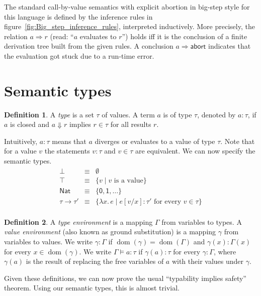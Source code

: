 \documentclass[12pt,a4paper]{article}
\theoremstyle{definition}
\newtheorem{definition}{Definition}
\theoremstyle{plain}
\newcommand{\abort}{\ensuremath{\mathsf{abort}}}
\newcommand{\abstr}[2]{\ensuremath{\lambda{#1}.\,{#2}}}
\newcommand{\Nat}{\ensuremath{\mathsf{Nat}}}
\DeclareMathOperator{\dom}{dom}
\begin{document}
The standard call-by-value semantics with explicit abortion in big-step style for this language
is defined by the inference rules in figure~\ref{fig:Big_step_inference_rules}, interpreted inductively.
More precisely, the relation $a \Rightarrow r$ (read: ``$a$ evaluates to $r$'') holds iff
it is the conclusion of a finite derivation tree built from the given rules. A conclusion
$a \Rightarrow \abort$ indicates that the evaluation got stuck due to a run-time error.


\section{Semantic types}
\label{sec:Semantic_types}

\begin{definition} \label{def:Types}
  A \emph{type} is a set $\tau$ of values. A term $a$ is of type $\tau$, denoted by $a : \tau$,
  if $a$ is closed and $a \Downarrow r$ implies $r \in \tau$ for all results $r$.
\end{definition}

Intuitively, $a : \tau$ means that $a$ diverges or evaluates to a value of type $\tau$. Note that
for a value $v$ the statements $v : \tau$ and $v \in \tau$ are equivalent.
We can now specify the semantic types.
\[\begin{array}{rcl}
  \bot &\equiv& \emptyset \\
  \top &\equiv& \{ v \mid \text{$v$ is a value} \} \\
  \Nat &\equiv& \{ \mathsf{0},\mathsf{1},\ldots \} \\
  \tau \to \tau' &\equiv& \{ \abstr{x}{e} \mid \text{$e[v/x] : \tau'$ for every $v \in \tau$} \} \\
\end{array}\]

\begin{definition} \label{def:Typing}
  A \emph{type environment} is a mapping $\Gamma$ from variables to types. A \emph{value environment} 
  (also known as ground substitution) is a mapping $\gamma$ from variables to values. We write
  $\gamma : \Gamma$ if $\dom(\gamma) = \dom(\Gamma)$ and $\gamma(x) : \Gamma(x)$ for every $x \in \dom(\gamma)$.
  We write $\Gamma \models a : \tau$ if $\gamma(a) : \tau$ for every $\gamma : \Gamma$, where $\gamma(a)$
  is the result of replacing the free variables of $a$ with their values under $\gamma$.
\end{definition}

Given these definitions, we can now prove the usual ``typability implies safety'' theorem.
Using our semantic types, this is almost trivial.
\end{document}
